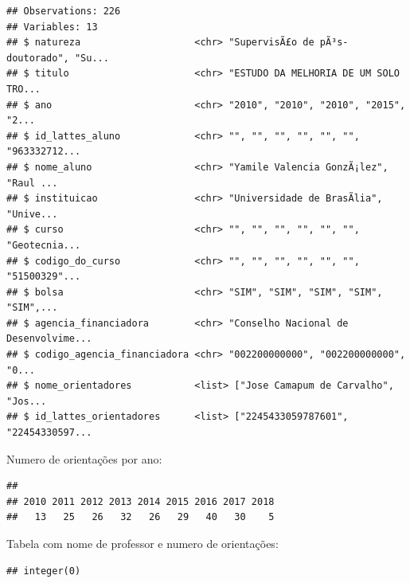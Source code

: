 \documentclass[]{article}
\newenvironment{Shaded}{\begin{snugshade}}{\end{snugshade}}
\newcommand{\DataTypeTok}[1]{\textcolor[rgb]{0.13,0.29,0.53}{#1}}
\newcommand{\DecValTok}[1]{\textcolor[rgb]{0.00,0.00,0.81}{#1}}
\newcommand{\KeywordTok}[1]{\textcolor[rgb]{0.13,0.29,0.53}{\textbf{#1}}}
\newcommand{\NormalTok}[1]{#1}
\newcommand{\OperatorTok}[1]{\textcolor[rgb]{0.81,0.36,0.00}{\textbf{#1}}}
\newcommand{\OtherTok}[1]{\textcolor[rgb]{0.56,0.35,0.01}{#1}}
\begin{document}
\begin{verbatim}
## Observations: 226
## Variables: 13
## $ natureza                    <chr> "SupervisÃ£o de pÃ³s-doutorado", "Su...
## $ titulo                      <chr> "ESTUDO DA MELHORIA DE UM SOLO TRO...
## $ ano                         <chr> "2010", "2010", "2010", "2015", "2...
## $ id_lattes_aluno             <chr> "", "", "", "", "", "", "963332712...
## $ nome_aluno                  <chr> "Yamile Valencia GonzÃ¡lez", "Raul ...
## $ instituicao                 <chr> "Universidade de BrasÃ­lia", "Unive...
## $ curso                       <chr> "", "", "", "", "", "", "Geotecnia...
## $ codigo_do_curso             <chr> "", "", "", "", "", "", "51500329"...
## $ bolsa                       <chr> "SIM", "SIM", "SIM", "SIM", "SIM",...
## $ agencia_financiadora        <chr> "Conselho Nacional de Desenvolvime...
## $ codigo_agencia_financiadora <chr> "002200000000", "002200000000", "0...
## $ nome_orientadores           <list> ["Jose Camapum de Carvalho", "Jos...
## $ id_lattes_orientadores      <list> ["2245433059787601", "22454330597...
\end{verbatim}

Numero de orientações por ano:

\begin{Shaded}
\end{Shaded}

\begin{verbatim}
## 
## 2010 2011 2012 2013 2014 2015 2016 2017 2018 
##   13   25   26   32   26   29   40   30    5
\end{verbatim}

Tabela com nome de professor e numero de orientações:

\begin{Shaded}
\end{Shaded}

\begin{verbatim}
## integer(0)
\end{verbatim}
\end{document}
